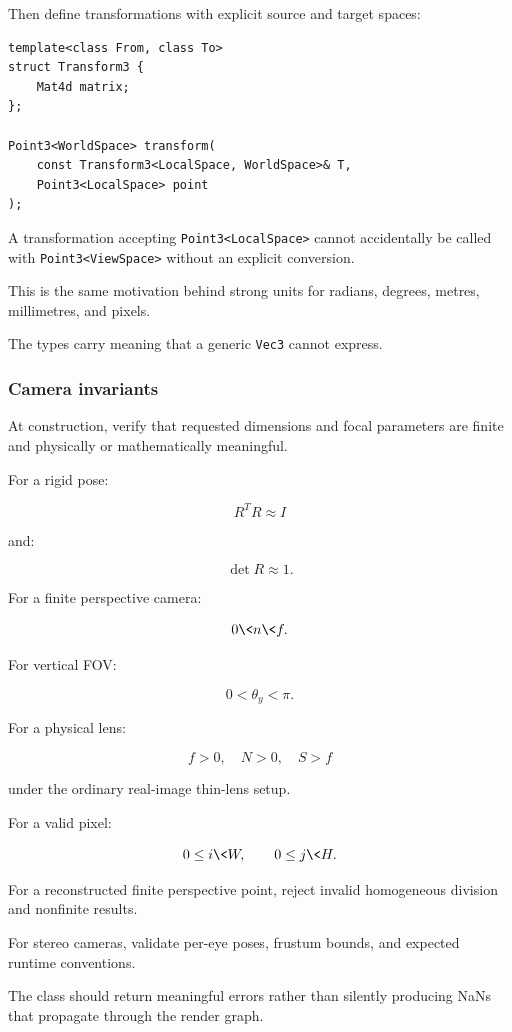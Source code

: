 Then define transformations with explicit source and target spaces:

\begin{verbatim}
template<class From, class To>
struct Transform3 {
    Mat4d matrix;
};

Point3<WorldSpace> transform(
    const Transform3<LocalSpace, WorldSpace>& T,
    Point3<LocalSpace> point
);
\end{verbatim}

A transformation accepting \texttt{Point3\textless{}LocalSpace\textgreater{}} cannot accidentally be called with \texttt{Point3\textless{}ViewSpace\textgreater{}} without an explicit conversion.

This is the same motivation behind strong units for radians, degrees, metres, millimetres, and pixels.

The types carry meaning that a generic \texttt{Vec3} cannot express.

\subsubsection{Camera invariants}\label{camera-invariants}

At construction, verify that requested dimensions and focal parameters are finite and physically or mathematically meaningful.

For a rigid pose:

\[ R^TR\approx I \]

and:

\[ \det R\approx1. \]

For a finite perspective camera:

\[ 0\<n\<f. \]

For vertical FOV:

\[ 0<\theta_y<\pi. \]

For a physical lens:

\[ f>0,\quad N>0,\quad S>f \]

under the ordinary real-image thin-lens setup.

For a valid pixel:

\[ 0\le i\<W,\qquad0\le j\<H. \]

For a reconstructed finite perspective point, reject invalid homogeneous division and nonfinite results.

For stereo cameras, validate per-eye poses, frustum bounds, and expected runtime conventions.

The class should return meaningful errors rather than silently producing NaNs that propagate through the render graph.

